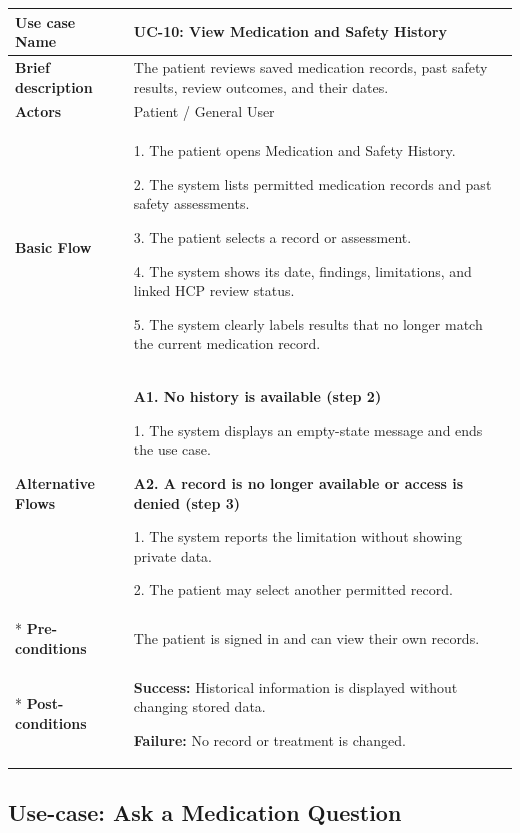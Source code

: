 \begin{longtable}{|p{}|p{}|}
\hline
\textbf{Use case Name} & UC-10: View Medication and Safety History \\ \hline
\textbf{Brief description} & The patient reviews saved medication records, past safety results, review outcomes, and their dates. \\ \hline
\textbf{Actors} & Patient / General User \\ \hline
\textbf{Basic Flow} &
1. The patient opens Medication and Safety History.\par
2. The system lists permitted medication records and past safety assessments.\par
3. The patient selects a record or assessment.\par
4. The system shows its date, findings, limitations, and linked HCP review status.\par
5. The system clearly labels results that no longer match the current medication record.
\\ \hline
\textbf{Alternative Flows} &
\textbf{A1. No history is available (step 2)}\par
1. The system displays an empty-state message and ends the use case.
\par
\textbf{A2. A record is no longer available or access is denied (step 3)}\par
1. The system reports the limitation without showing private data.\par
2. The patient may select another permitted record.
\\* \hline
\textbf{Pre-conditions} & The patient is signed in and can view their own records. \\* \hline
\textbf{Post-conditions} & \textbf{Success:} Historical information is displayed without changing stored data.\par
\textbf{Failure:} No record or treatment is changed. \\ \hline
\end{longtable}


\clearpage
\subsection{Use-case: Ask a Medication Question}
\label{uc:uc-11}

